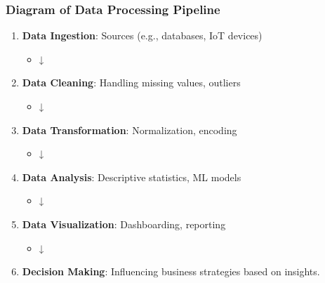 \documentclass[aspectratio=169]{beamer}
\begin{document}
\begin{frame}[fragile]
    \frametitle{Diagram of Data Processing Pipeline}
    
    \begin{enumerate}
        \item \textbf{Data Ingestion}: Sources (e.g., databases, IoT devices)
            \begin{itemize}
                \item ↓
            \end{itemize}
        \item \textbf{Data Cleaning}: Handling missing values, outliers
            \begin{itemize}
                \item ↓
            \end{itemize}
        \item \textbf{Data Transformation}: Normalization, encoding
            \begin{itemize}
                \item ↓
            \end{itemize}
        \item \textbf{Data Analysis}: Descriptive statistics, ML models
            \begin{itemize}
                \item ↓
            \end{itemize}
        \item \textbf{Data Visualization}: Dashboarding, reporting
            \begin{itemize}
                \item ↓
            \end{itemize}
        \item \textbf{Decision Making}: Influencing business strategies based on insights.
    \end{enumerate}
\end{frame}
\end{document}
